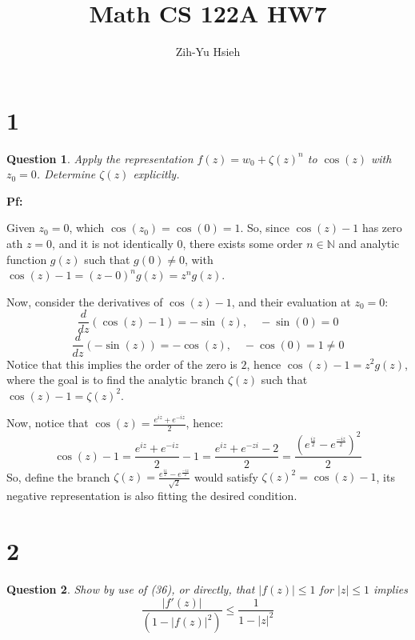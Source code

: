 \documentclass{article}
\title{Math CS 122A HW7}
\author{Zih-Yu Hsieh}
\newtheorem{question}{Question}
\begin{document}
\maketitle

\section*{1}
\begin{myBox}[]{}
    \begin{question}
        Apply the representation $f(z) = w_0+\zeta(z)^n$ to $\cos(z)$ with $z_0=0$.
        Determine $\zeta(z)$ explicitly.
    \end{question}
\end{myBox}

\textbf{Pf:}

Given $z_0=0$, which $\cos(z_0)=\cos(0)=1$. So, since $\cos(z)-1$ has zero ath $z=0$, and it is not identically $0$, there exists some order $n\in\mathbb{N}$ and analytic function $g(z)$ such that $g(0)\neq 0$,
with $\cos(z)-1 = (z-0)^ng(z) = z^ng(z)$.

Now, consider the derivatives of $\cos(z)-1$, and their evaluation at $z_0=0$:
$$\frac{d}{dz}(\cos(z)-1)=-\sin(z),\quad -\sin(0)=0$$
$$\frac{d}{dz}(-\sin(z))=-\cos(z),\quad -\cos(0)=1\neq 0$$
Notice that this implies the order of the zero is $2$, hence $\cos(z)-1 = z^2g(z)$, where the goal is to find the analytic branch $\zeta(z)$ such that $\cos(z)-1 = \zeta(z)^2$.

\hfill

Now, notice that $\cos(z)=\frac{e^{iz}+e^{-iz}}{2}$, hence: 
$$\cos(z)-1 = \frac{e^{iz}+e^{-iz}}{2} -1 = \frac{e^{iz}+e^{-zi}-2}{2} = \frac{(e^\frac{iz}{2}-e^{\frac{-iz}{2}})^2}{2}$$
So, define the branch $\zeta(z) = \frac{e^\frac{iz}{2}-e^{\frac{-iz}{2}}}{\sqrt{2}}$ would satisfy $\zeta(z)^2 = \cos(z)-1$, its negative representation is also fitting the desired condition.



\break

\section*{2}
\begin{myBox}[]{}
    \begin{question}
        Show by use of (36), or directly, that $|f(z)|\leq 1$ for $|z|\leq 1$ implies
        $$\frac{|f'(z)|}{(1-|f(z)|^2)}\leq \frac{1}{1-|z|^2}$$
    \end{question}
\end{myBox}
\end{document}

